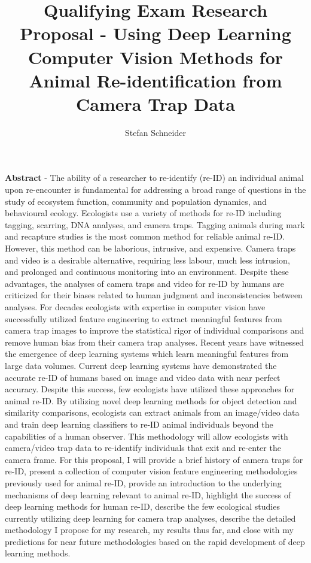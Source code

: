 \documentclass[11pt]{article}
\begin{document}
\title{Qualifying Exam Research Proposal - Using Deep Learning Computer Vision Methods for Animal Re-identification from Camera Trap Data}

\author{Stefan Schneider}

\maketitle

\textbf{Abstract} - The ability of a researcher to re-identify (re-ID) an individual animal upon re-encounter is fundamental for addressing a broad range of questions in the study of ecosystem function, community and population dynamics, and behavioural ecology. Ecologists use a variety of methods for re-ID including tagging, scarring, DNA analyses, and camera traps. Tagging animals during mark and recapture studies is the most common method for reliable animal re-ID. However, this method can be laborious, intrusive, and expensive. Camera traps and video is a desirable alternative, requiring less labour, much less intrusion, and prolonged and continuous monitoring into an environment. Despite these advantages, the analyses of camera traps and video for re-ID by humans are criticized for their biases related to human judgment and inconsistencies between analyses. For decades ecologists with expertise in computer vision have successfully utilized feature engineering to extract meaningful features from camera trap images to improve the statistical rigor of individual comparisons and remove human bias from their camera trap analyses. Recent years have witnessed the emergence of deep learning systems which learn meaningful features from large data volumes. Current deep learning systems have demonstrated the accurate re-ID of humans based on image and video data with near perfect accuracy. Despite this success, few ecologists have utilized these approaches for animal re-ID. By utilizing novel deep learning methods for object detection and similarity comparisons, ecologists can extract animals from an image/video data and train deep learning classifiers to re-ID animal individuals beyond the capabilities of a human observer. This methodology will allow ecologists with camera/video trap data to re-identify individuals that exit and re-enter the camera frame. For this proposal, I will provide a brief history of camera traps for re-ID, present a collection of computer vision feature engineering methodologies previously used for animal re-ID, provide an introduction to the underlying mechanisms of deep learning relevant to animal re-ID, highlight the success of deep learning methods for human re-ID, describe the few ecological studies currently utilizing deep learning for camera trap analyses, describe the detailed methodology I propose for my research, my results thus far, and close with my predictions for near future methodologies based on the rapid development of deep learning methods.
\end{document}
